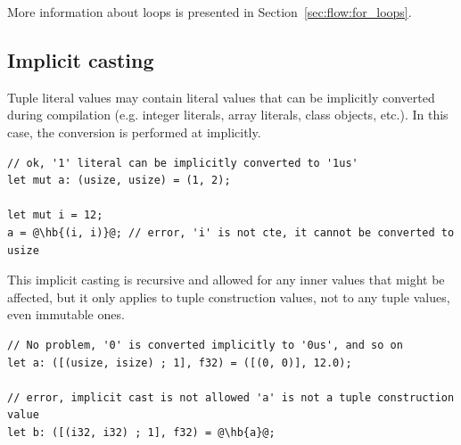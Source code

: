 More information about  loops is presented in Section~\ref{sec:flow:for_loops}.

\subsection{Implicit casting}

Tuple literal values may contain literal values that can be implicitly
converted during compilation (e.g. integer literals, array literals, class
objects, etc.). In this case, the conversion is performed at 
implicitly.

\begin{lstlisting}[style=coloredverbatimError, escapechar=@]
// ok, '1' literal can be implicitly converted to '1us'
let mut a: (usize, usize) = (1, 2);

let mut i = 12;
a = @\hb{(i, i)}@; // error, 'i' is not cte, it cannot be converted to usize
\end{lstlisting}

This implicit casting is recursive and allowed for any inner values that might
be affected, but it only applies to tuple construction values, not to any tuple
values, even immutable ones.

\begin{lstlisting}[style=coloredverbatimError, escapechar=@]
// No problem, '0' is converted implicitly to '0us', and so on
let a: ([(usize, isize) ; 1], f32) = ([(0, 0)], 12.0);

// error, implicit cast is not allowed 'a' is not a tuple construction value
let b: ([(i32, i32) ; 1], f32) = @\hb{a}@;
\end{lstlisting}

\vfill%
\pagebreak
